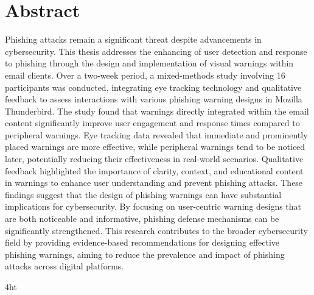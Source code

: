 \documentclass[
  a4paper,  %
  twoside,  %
  bibliography=totoc,
  headsepline,
  cleardoublepage=empty,
  parskip=half,
  draft=false
]{scrbook}
\begin{document}
\cleardoublepage

\section*{Abstract} 
Phishing attacks remain a significant threat despite advancements in cybersecurity. This thesis addresses the enhancing of user detection and response to phishing through the design and implementation of visual warnings within email clients. Over a two-week period, a mixed-methods study involving 16 participants was conducted, integrating eye tracking technology and qualitative feedback to assess interactions with various phishing warning designs in Mozilla Thunderbird. \newline
The study found that warnings directly integrated within the email content significantly improve user engagement and response times compared to peripheral warnings. Eye tracking data revealed that immediate and prominently placed warnings are more effective, while peripheral warnings tend to be noticed later, potentially reducing their effectiveness in real-world scenarios. Qualitative feedback highlighted the importance of clarity, context, and educational content in warnings to enhance user understanding and prevent phishing attacks. \newline
These findings suggest that the design of phishing warnings can have substantial implications for cybersecurity. By focusing on user-centric warning designs that are both noticeable and informative, phishing defense mechanisms can be significantly strengthened. This research contributes to the broader cybersecurity field by providing evidence-based recommendations for designing effective phishing warnings, aiming to reduce the prevalence and impact of phishing attacks across digital platforms.

\cleardoublepage



\iftex4ht
\else
\fi

%
%

%
%
%
\tableofcontents
\end{document}
